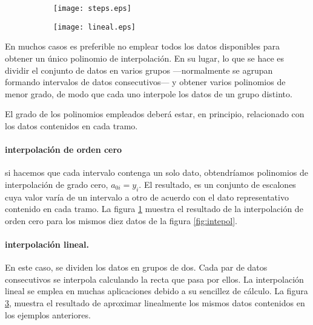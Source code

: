 \begin{figure}
\centering
\begin{subfigure}{0.45\textwidth}
	\texttt{[image: steps.eps]}
	\label{fig:stepwise}
\end{subfigure}
\begin{subfigure}{0.45\textwidth}
	\texttt{[image: lineal.eps]}
	\label{fig:lineal}
\end{subfigure}
\end{figure}

\begin{paracol}{2}
En muchos casos es preferible no emplear todos los datos disponibles para obtener un único polinomio de interpolación. En su lugar, lo que se hace es dividir el conjunto de datos en varios grupos ---normalmente se agrupan formando intervalos de datos consecutivos--- y obtener varios polinomios de menor grado, de modo que cada uno interpole los datos de un grupo distinto. 

El grado de los polinomios empleados deberá estar, en principio, relacionado con los datos contenidos en cada tramo.


\paragraph{interpolación de orden cero}  si hacemos que cada intervalo contenga un solo dato, obtendríamos polinomios de interpolación de grado cero, $a_{0i}=y_i$. El resultado, es un conjunto de escalones cuya valor varía de un intervalo a otro de acuerdo con el dato representativo contenido en cada tramo. La figura \ref{fig:stepwise} muestra el resultado de la interpolación de orden cero para los mismos diez datos de la figura \ref{fig:intepol}.

\paragraph{interpolación lineal.}  En este caso, se dividen los datos en grupos de dos. Cada par de datos consecutivos se interpola calculando la recta que pasa por ellos. La interpolación lineal se emplea en muchas aplicaciones debido a su sencillez de cálculo. La figura \ref{fig:lineal}, muestra el resultado de aproximar linealmente los mismos datos contenidos en los ejemplos anteriores.


\end{paracol}
